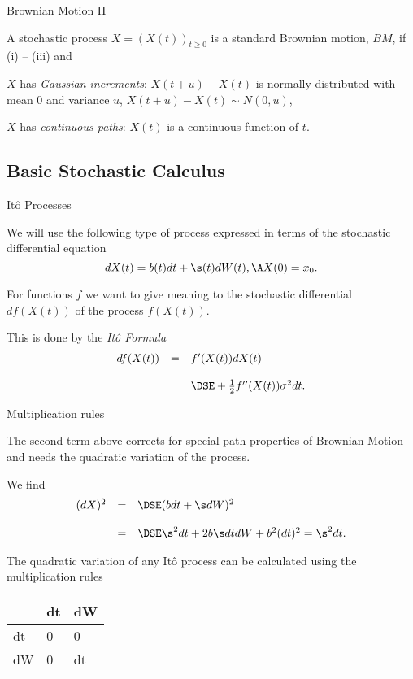 {Brownian Motion II}

A stochastic process $X=(X(t))_{t \geq 0}$ is a standard
Brownian motion, $BM$, if (i) -- (iii) and
\item[(iv)]  $X$ has {\it Gaussian increments}: $X(t+u) - X(t)$ is
normally distributed with mean $0$ and variance $u$, $X(t+u) -
X(t) \sim N(0,u)$, \item[(v)]  $X$ has {\it continuous paths}:
$X(t)$ is a continuous function of $t$.

\subsection{Basic Stochastic Calculus}

{ It{\^o} Processes}
\item<1-> We will use the following type of process expressed
in terms of the stochastic differential equation
$$
dX(t) = b(t) dt + \s(t) dW(t), \A X(0) = x_0.
$$
\item<2-> For functions $f$ we want to give  meaning to the stochastic differential
$df(X(t))$ of the process $f(X(t))$.
\item<3-> This is done by the {\it It{\^o} Formula}
$$
\begin{array}{lll}
df(X(t)) &=& f'(X(t)) dX(t)\\*[12pt]
&& \DSE+ \frac{1}{2} f''(X(t)) \sigma^2 dt.
\end{array}
$$

{Multiplication rules}
\item<1-> The second term above corrects for special path properties of
Brownian Motion and needs the quadratic variation of the process.
\item<2-> We find
$$
\begin{array}{lll}
(d X)^2 &=&\DSE (b dt + \s dW)^2 \\*[12pt]
&=&\DSE \s^2 dt + 2 b \s dt dW + b^2 (dt)^2 = \s^2 dt.
\end{array}
$$
\item<3-> The quadratic variation of any It{\^o} process can be calculated
using the multiplication rules\\
\begin{center}
\begin{tabular}{|l|ll|}
\hline
& dt &dW \\\hline
dt& 0 & 0\\
dW & 0 &dt \\\hline
\end{tabular}
\end{center}

